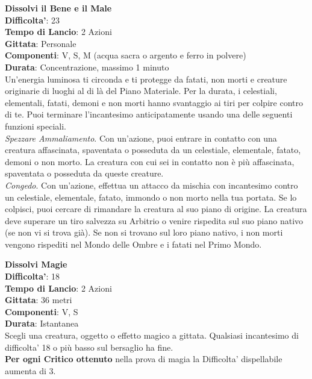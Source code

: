 \begin{multicols}{2}
\medskip\textbf{Dissolvi il Bene e il Male}\\
\textbf{Difficolta'}: 23\\
\textbf{Tempo di Lancio}: 2 Azioni\\
\textbf{Gittata}: Personale\\
\textbf{Componenti}: V, S, M (acqua sacra o argento e ferro in polvere)\\
\textbf{Durata}: Concentrazione, massimo 1 minuto \\
Un’energia luminosa ti circonda e ti protegge da fatati, non morti e creature originarie di luoghi al di là del Piano Materiale. Per la durata, i celestiali, elementali, fatati, demoni e non morti hanno svantaggio ai tiri per colpire contro di te. Puoi terminare l’incantesimo anticipatamente usando una delle seguenti funzioni speciali.\\
\textit{Spezzare Ammaliamento}. Con un’azione, puoi entrare in contatto con una creatura affascinata, spaventata o posseduta da un celestiale, elementale, fatato, demoni o non morto. La creatura con cui sei in contatto non è più affascinata, spaventata o posseduta da queste creature.\\
\textit{Congedo}. Con un’azione, effettua un attacco da mischia con incantesimo contro un celestiale, elementale, fatato, immondo o non morto nella tua portata. Se lo colpisci, puoi cercare di rimandare la creatura al suo piano di origine. La creatura deve superare un tiro salvezza su Arbitrio o venire rispedita sul suo piano nativo (se non vi si trova già). Se non si trovano sul loro piano nativo, i non morti vengono rispediti nel Mondo delle Ombre e i fatati nel Primo Mondo.

\medskip\textbf{Dissolvi Magie}\\
\textbf{Difficolta'}: 18\\
\textbf{Tempo di Lancio}: 2 Azioni\\
\textbf{Gittata}: 36 metri\\
\textbf{Componenti}: V, S\\
\textbf{Durata}: Istantanea\\
Scegli una creatura, oggetto o effetto magico a gittata. Qualsiasi incantesimo di difficolta' 18 o più basso sul bersaglio ha fine. \\
\textbf{Per ogni Critico ottenuto} nella prova di magia la Difficolta' dispellabile aumenta di 3.


\end{multicols}
